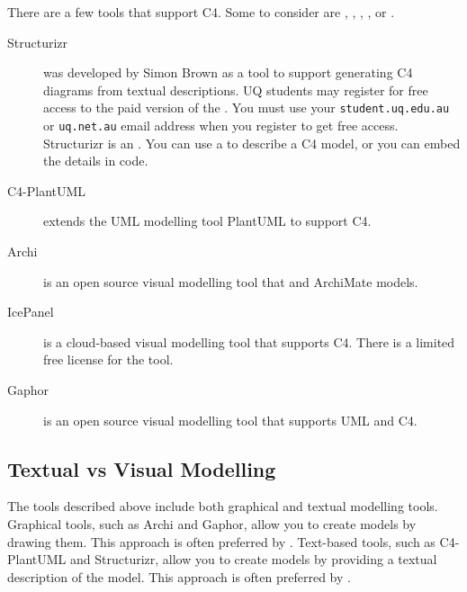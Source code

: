 There are a few tools that support C4. Some to consider are ,
, ,
, or .

\begin{description}
    \item[Structurizr]
        was developed by Simon Brown as a tool to support generating C4 diagrams from textual descriptions.
        UQ students may register for free access to the paid version of the .
        You must use your \texttt{student.uq.edu.au} or \texttt{uq.net.au} email address when you register to get free access.
        Structurizr is an .
        You can use a  to describe a C4 model,
        or you can embed the details in  code.
    \item[C4-PlantUML] extends the UML modelling tool PlantUML to support C4.
    \item[Archi] is an open source visual modelling tool that
         and ArchiMate models.
    \item[IcePanel] is a cloud-based visual modelling tool that supports C4. There is a limited free license for the tool.
    \item[Gaphor] is an open source visual modelling tool that supports UML and C4.
\end{description}

\subsection{Textual vs Visual Modelling}
The tools described above include both graphical and textual modelling tools.
Graphical tools, such as Archi and Gaphor, allow you to create models by drawing them.
This approach is often preferred by .
Text-based tools, such as C4-PlantUML and Structurizr, allow you to create models by providing a textual description of the model.
This approach is often preferred by .

